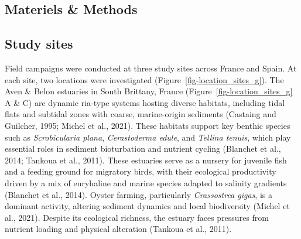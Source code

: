 \documentclass[
  letterpaper,
  11pt,
  english,
  singlespacing,
  headsepline]{MastersDoctoralThesis}
\begin{document}
\begin{spacing}{1.5}
\section{Materiels \& Methods}\label{materiels-methods}

\subsection{Study sites}\label{study-sites-1}

Field campaigns were conducted at three study sites across France and
Spain. At each site, two locations were investigated
(Figure~\ref{fig-location_sites_g}). The Aven \& Belon estuaries in
South Brittany, France (Figure~\ref{fig-location_sites_g} A \& C) are
dynamic ria-type systems hosting diverse habitats, including tidal flats
and subtidal zones with coarse, marine-origin sediments (Castaing and
Guilcher, 1995; Michel et al., 2021). These habitats support key benthic
species such as \emph{Scrobicularia plana}, \emph{Cerastoderma edule},
and \emph{Tellina tenuis}, which play essential roles in sediment
bioturbation and nutrient cycling (Blanchet et al., 2014; Tankoua et
al., 2011). These estuaries serve as a nursery for juvenile fish and a
feeding ground for migratory birds, with their ecological productivity
driven by a mix of euryhaline and marine species adapted to salinity
gradients (Blanchet et al., 2014). Oyster farming, particularly
\emph{Crassostrea gigas}, is a dominant activity, altering sediment
dynamics and local biodiversity (Michel et al., 2021). Despite its
ecological richness, the estuary faces pressures from nutrient loading
and physical alteration (Tankoua et al., 2011).

\begin{figure}

\end{figure}
\end{spacing}
\end{document}
